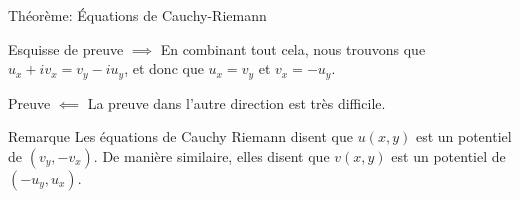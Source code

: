\documentclass[a4paper]{article}
\begin{document}
\begin{parag}{Théorème: Équations de Cauchy-Riemann}
\begin{subparag}{Esquisse de preuve $\implies$}
        En combinant tout cela, nous trouvons que $u_x + i v_x = v_y - iu_y$, et donc que $u_x = v_y$ et $v_x = -u_y$.
    \end{subparag}

    \begin{subparag}{Preuve $\impliedby$}
        La preuve dans l'autre direction est très difficile.
    \end{subparag}

    \begin{subparag}{Remarque}
        Les équations de Cauchy Riemann disent que $u\left(x, y\right)$ est un potentiel de $\left(v_y, -v_x\right)$. De manière similaire, elles disent que $v\left(x, y\right)$ est un potentiel de $\left(-u_y, u_x\right)$.
    \end{subparag}
\end{parag}
\end{document}
